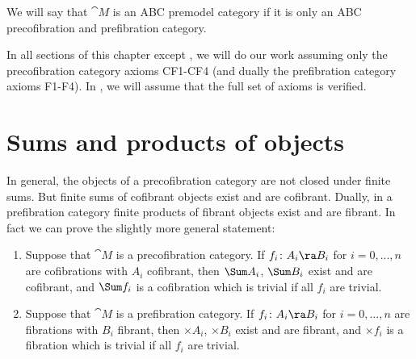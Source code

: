 We will say that ${\cat M}$ is an ABC premodel category if it is only an ABC precofibration and prefibration category.

In all sections of this chapter except , we will do our work assuming only the precofibration category axioms CF1-CF4 (and dually the prefibration category axioms F1-F4). In , we will assume that the full set of axioms is verified.

\section{Sums and products of objects}
\label{sec:sumsproducts}

In general, the objects of a precofibration category are not closed under finite sums. But finite sums of cofibrant objects exist and are cofibrant. Dually, in a prefibration category finite products of fibrant objects exist and are fibrant. In fact we can prove the slightly more general statement:

\begin{lem}
\label{lem:cofsums}
\mbox{}
\begin{enumerate}
\item
Suppose that ${\cat M}$ is a precofibration category. If $f_i \colon A_i \ra B_i$ for $i = 0, ..., n$ are cofibrations with $A_i$ cofibrant, then $\Sum A_i$, $\Sum B_i$ exist and are cofibrant, and $\Sum f_i$ is a cofibration which is trivial if all $f_i$ are trivial.
\item
Suppose that ${\cat M}$ is a prefibration category. If $f_i \colon A_i \ra B_i$ for $i = 0, ..., n$ are fibrations with $B_i$ fibrant, then $\times A_i$, $\times B_i$ exist and are fibrant, and $\times f_i$ is a fibration which is trivial if all $f_i$ are trivial.
\end{enumerate}
\end{lem}

